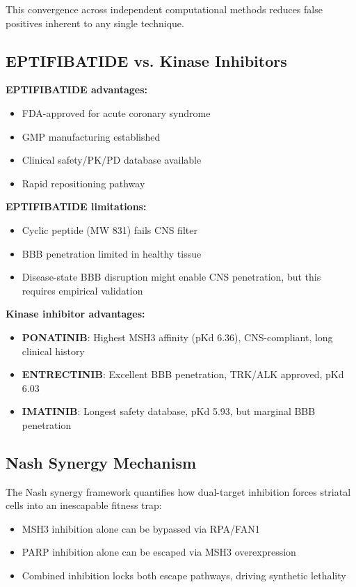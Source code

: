 \documentclass[12pt,a4paper]{article}
\begin{document}
This convergence across independent computational methods reduces false positives inherent to any single technique.

\subsection{EPTIFIBATIDE vs. Kinase Inhibitors}

\textbf{EPTIFIBATIDE advantages:}
\begin{itemize}
\item FDA-approved for acute coronary syndrome
\item GMP manufacturing established
\item Clinical safety/PK/PD database available
\item Rapid repositioning pathway
\end{itemize}

\textbf{EPTIFIBATIDE limitations:}
\begin{itemize}
\item Cyclic peptide (MW 831) fails CNS filter
\item BBB penetration limited in healthy tissue
\item Disease-state BBB disruption might enable CNS penetration, but this requires empirical validation
\end{itemize}

\textbf{Kinase inhibitor advantages:}
\begin{itemize}
\item \textbf{PONATINIB}: Highest MSH3 affinity (pKd 6.36), CNS-compliant, long clinical history
\item \textbf{ENTRECTINIB}: Excellent BBB penetration, TRK/ALK approved, pKd 6.03
\item \textbf{IMATINIB}: Longest safety database, pKd 5.93, but marginal BBB penetration
\end{itemize}

\subsection{Nash Synergy Mechanism}

The Nash synergy framework quantifies how dual-target inhibition forces striatal cells into an inescapable fitness trap:
\begin{itemize}
\item MSH3 inhibition alone can be bypassed via RPA/FAN1
\item PARP inhibition alone can be escaped via MSH3 overexpression
\item Combined inhibition locks both escape pathways, driving synthetic lethality
\end{itemize}
\end{document}
